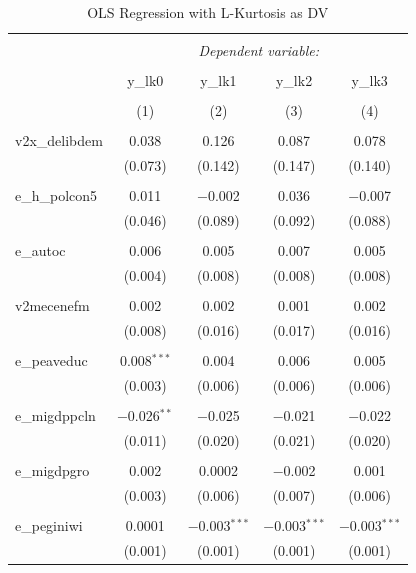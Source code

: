 \documentclass[12pt]{article}\usepackage[]{graphicx}\usepackage[]{color}
\begin{document}
\begin{table}[!htbp] \centering 
  \caption{OLS Regression with L-Kurtosis as DV} 
  \label{lkols} 
\begin{tabular}{@{\extracolsep{5pt}}lcccc} 
\\[-1.8ex]\hline 
\hline \\[-1.8ex] 
 & \multicolumn{4}{c}{\textit{Dependent variable:}} \\ 
\cline{2-5} 
\\[-1.8ex] & y\_lk0 & y\_lk1 & y\_lk2 & y\_lk3 \\ 
\\[-1.8ex] & (1) & (2) & (3) & (4)\\ 
\hline \\[-1.8ex] 
 v2x\_delibdem & 0.038 & 0.126 & 0.087 & 0.078 \\ 
  & (0.073) & (0.142) & (0.147) & (0.140) \\ 
  & & & & \\ 
 e\_h\_polcon5 & 0.011 & $-$0.002 & 0.036 & $-$0.007 \\ 
  & (0.046) & (0.089) & (0.092) & (0.088) \\ 
  & & & & \\ 
 e\_autoc & 0.006 & 0.005 & 0.007 & 0.005 \\ 
  & (0.004) & (0.008) & (0.008) & (0.008) \\ 
  & & & & \\ 
 v2mecenefm & 0.002 & 0.002 & 0.001 & 0.002 \\ 
  & (0.008) & (0.016) & (0.017) & (0.016) \\ 
  & & & & \\ 
 e\_peaveduc & 0.008$^{***}$ & 0.004 & 0.006 & 0.005 \\ 
  & (0.003) & (0.006) & (0.006) & (0.006) \\ 
  & & & & \\ 
 e\_migdppcln & $-$0.026$^{**}$ & $-$0.025 & $-$0.021 & $-$0.022 \\ 
  & (0.011) & (0.020) & (0.021) & (0.020) \\ 
  & & & & \\ 
 e\_migdpgro & 0.002 & 0.0002 & $-$0.002 & 0.001 \\ 
  & (0.003) & (0.006) & (0.007) & (0.006) \\ 
  & & & & \\ 
 e\_peginiwi & 0.0001 & $-$0.003$^{***}$ & $-$0.003$^{***}$ & $-$0.003$^{***}$ \\ 
  & (0.001) & (0.001) & (0.001) & (0.001) \\ 

\end{tabular}
\end{table}
\end{document}
